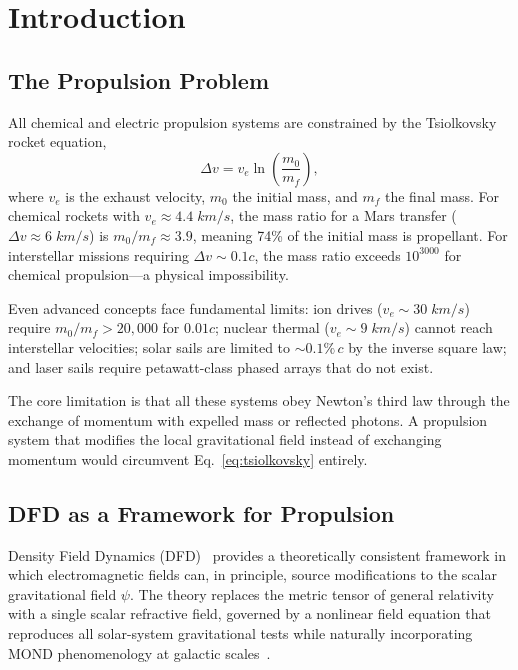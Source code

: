 \documentclass[twocolumn,prl,superscriptaddress,nofootinbib,longbibliography,floatfix]{revtex4-2}
\begin{document}
\section{Introduction}\label{sec:intro}

\subsection{The Propulsion Problem}

All chemical and electric propulsion systems are constrained by the
Tsiolkovsky rocket equation,
\begin{equation}
\Delta v = v_e \ln\!\left(\frac{m_0}{m_f}\right),
\label{eq:tsiolkovsky}
\end{equation}
where $v_e$ is the exhaust velocity, $m_0$ the initial mass, and $m_f$
the final mass.  For chemical rockets with $v_e \approx
4.4\;\si{km/s}$, the mass ratio for a Mars transfer
($\Delta v \approx 6\;\si{km/s}$) is $m_0/m_f \approx 3.9$, meaning
74\% of the initial mass is propellant.  For interstellar missions
requiring $\Delta v \sim 0.1c$, the mass ratio exceeds $10^{3000}$ for
chemical propulsion---a physical impossibility.

Even advanced concepts face fundamental limits: ion drives
($v_e \sim 30\;\si{km/s}$) require $m_0/m_f > 20{,}000$ for $0.01c$;
nuclear thermal ($v_e \sim 9\;\si{km/s}$) cannot reach interstellar
velocities; solar sails are limited to $\sim 0.1\%\,c$ by the inverse
square law; and laser sails require petawatt-class phased arrays that do
not exist.

The core limitation is that all these systems obey Newton's third law
through the exchange of momentum with expelled mass or reflected photons.
A propulsion system that modifies the local gravitational field instead
of exchanging momentum would circumvent Eq.~\eqref{eq:tsiolkovsky}
entirely.

\subsection{DFD as a Framework for Propulsion}

Density Field Dynamics (DFD)~\cite{Alcock2025DFD} provides a
theoretically consistent framework in which electromagnetic fields can,
in principle, source modifications to the scalar gravitational field
$\psi$.  The theory replaces the metric tensor of general relativity
with a single scalar refractive field, governed by a nonlinear field
equation that reproduces all solar-system gravitational tests while
naturally incorporating MOND phenomenology at galactic
scales~\cite{Alcock2025DFD,Milgrom1983,BekensteinMilgrom1984}.
\end{document}
